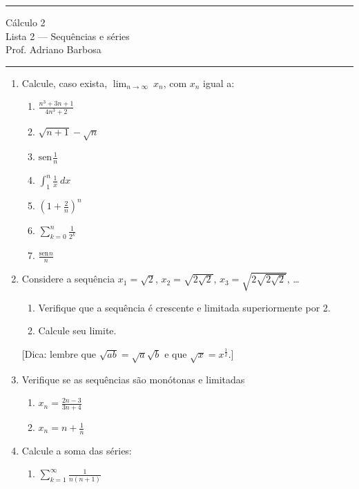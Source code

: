 \documentclass{article}
\newcommand{\ds}{\displaystyle}
\providecommand{\sin}{} \renewcommand{\sin}{\mathrm{sen}\hspace{1pt}}
\begin{document}
\noindent{}\rule{\textwidth}{0.4pt}
\begin{center}
	C\'alculo 2\\
	Lista 2 --- Sequ\^encias e s\'eries \\
	\vspace{0.2cm}
	Prof. Adriano Barbosa
\end{center}
\noindent{}\rule{\textwidth}{0.4pt}

\begin{enumerate}
\item Calcule, caso exista, $\displaystyle\lim_{n\rightarrow\infty}\ x_n$, com $x_n$ igual a:
	\begin{enumerate}
		\item $\ds\frac{n^3+3n+1}{4n^3+2}$
		\item $\sqrt{n+1}-\sqrt{n}$
		\item $\ds\sin\frac{1}{n}$
		\item $\ds\int_1^n \frac{1}{x}\ dx$
		\item $\ds\left(1+\frac{2}{n}\right)^n$
		\item $\ds\sum_{k=0}^n \frac{1}{2^k}$
		\item $\ds\frac{\sin n}{n}$
	\end{enumerate}

\item Considere a sequ\^encia $x_1=\sqrt{2}$, $x_2=\sqrt{2\sqrt{2}}$, $x_3=\sqrt{2\sqrt{2\sqrt{2}}}$, \ldots
	\begin{enumerate}
		\item Verifique que a sequ\^encia \'e crescente e limitada superiormente por 2.
		\item Calcule seu limite.
	\end{enumerate}
[Dica: lembre que $\sqrt{ab} = \sqrt{a}\sqrt{b}$ e que $\sqrt{x} = x^\frac{1}{2}$.]

\item Verifique se as sequ\^encias s\~ao mon\'otonas e limitadas
	\begin{enumerate}
		\item $x_n = \ds\frac{2n-3}{3n+4}$
		\item $x_n = n + \ds\frac{1}{n}$
	\end{enumerate}

\item Calcule a soma das s\'eries:
	\begin{enumerate}
		\item $\ds\sum_{k=1}^\infty\ds\frac{1}{n(n+1)}$


\end{enumerate}
\end{enumerate}
\end{document}
